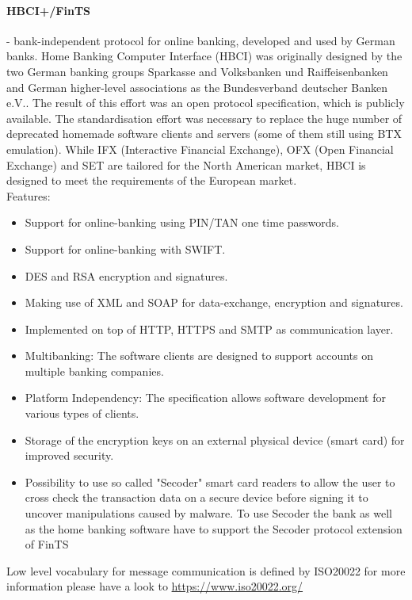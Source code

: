 	\paragraph{HBCI+/FinTS} - bank-independent protocol for online banking, developed and used by German banks.  Home Banking Computer Interface (HBCI) was originally designed by the two German banking groups Sparkasse and Volksbanken und Raiffeisenbanken and German higher-level associations as the Bundesverband deutscher Banken e.V.. The result of this effort was an open protocol specification, which is publicly available. The standardisation effort was necessary to replace the huge number of deprecated homemade software clients and servers (some of them still using BTX emulation). While IFX (Interactive Financial Exchange), OFX (Open Financial Exchange) and SET are tailored for the North American market, HBCI is designed to meet the requirements of the European market.\cite{finTS}\\
	Features\cite{finTS}:\\
	\begin{itemize}
		\item Support for online-banking using PIN/TAN one time passwords.
		\item Support for online-banking with SWIFT.
		\item DES and RSA encryption and signatures.
		\item Making use of XML and SOAP for data-exchange, encryption and signatures.
		\item Implemented on top of HTTP, HTTPS and SMTP as communication layer.
		\item Multibanking: The software clients are designed to support accounts on multiple banking companies.
		\item Platform Independency: The specification allows software development for various types of clients.
		\item Storage of the encryption keys on an external physical device (smart card) for improved security.
		\item Possibility to use so called "Secoder" smart card readers to allow the user to cross check the transaction data on a secure device before signing it to uncover manipulations caused by malware. To use Secoder the bank as well as the home banking software have to support the Secoder protocol extension of FinTS
	\end{itemize}
	Low level vocabulary for message communication is defined by ISO20022 for more information please have a look to \url{https://www.iso20022.org/}
	

